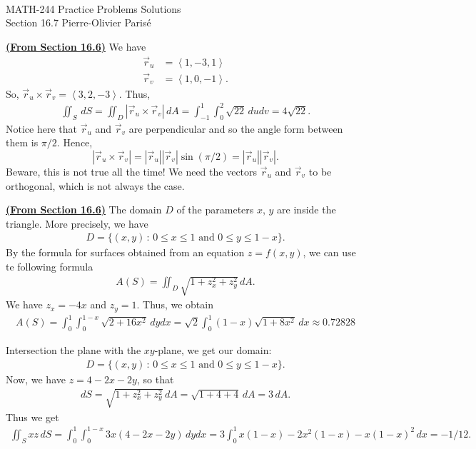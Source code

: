 


	\noindent \hrulefill \\
	MATH-244 \semester \hfill Practice Problems Solutions\\
	Section 16.7 \hfill Pierre-Olivier Paris{\'e} \\\vspace*{-1cm}
	
	\noindent\hrulefill
	
	\spc	

	\underline{\textbf{(From Section 16.6)}}
	We have
		\begin{align*}
		\vec{r}_u &= \left\langle 1 , -3, 1 \right\rangle \\
		\vec{r}_v &= \left\langle 1, 0, -1 \right\rangle .
		\end{align*}
	So, $\vec{r}_u \times \vec{r}_v = \left\langle 3, 2, -3 \right\rangle$. Thus,
		\begin{align*}
		\iint_S \, dS = \iint_D |\vec{r}_u \times \vec{r}_v | \, dA = \int_{-1}^1 \int_0^2 \sqrt{22} \, du dv = 4 \sqrt{22} .
		\end{align*}
	Notice here that $\vec{r}_u$ and $\vec{r}_v$ are perpendicular and so the angle form between them is $\pi/2$. Hence,
		\[
			|\vec{r}_u \times \vec{r}_v| = |\vec{r}_u | |\vec{r}_v| \sin (\pi /2 ) = |\vec{r}_u| |\vec{r}_v | .
		\]
	Beware, this is not true all the time! We need the vectors $\vec{r}_u$ and $\vec{r}_v$ to be orthogonal, which is not always the case. 
	
	\underline{\textbf{(From Section 16.6)}}
	The domain $D$ of the parameters $x$, $y$ are inside the triangle. More precisely, we have
		\begin{align*}
		D = \{ (x, y) \, : \, 0 \leq x \leq 1 \text{ and } 0 \leq y \leq 1 - x \} .
		\end{align*}
	By the formula for surfaces obtained from an equation $z = f(x, y)$, we can use te following formula
		\begin{align*}
		A (S) = \iint_D \sqrt{1 + z_x^2 + z_y^2} \, dA .
		\end{align*}
	We have $z_x = -4x$ and $z_y = 1$. Thus, we obtain
		\begin{align*}
		A (S) = \int_0^1 \int_0^{1 - x} \sqrt{2 + 16x^2} \, dy dx = \sqrt{2} \int_0^1 (1 - x) \sqrt{1 + 8x^2} \, dx \approx 0.72828
		\end{align*}
		
	\spc
	
	Intersection the plane with the $xy$-plane, we get our domain:
		\begin{align*}
		D = \{ (x, y) \, : \, 0 \leq x \leq 1 \text{ and } 0 \leq y \leq 1 - x \} .
		\end{align*}
	Now, we have $z = 4 - 2x - 2y$, so that
		\begin{align*}
		dS = \sqrt{1 + z_x^2 + z_y^2} \, dA = \sqrt{1 + 4 + 4} \, dA = 3 \, dA .
		\end{align*}
	Thus we get
		\begin{align*}
		\iint_S xz \, dS = \int_0^1 \int_0^{1 - x} 3x (4 - 2x - 2y) \, dy dx = 3 \int_0^1 x (1 - x) - 2x^2 (1 - x) - x (1 - x)^2 \, dx = -1/12 .
		\end{align*}
		

